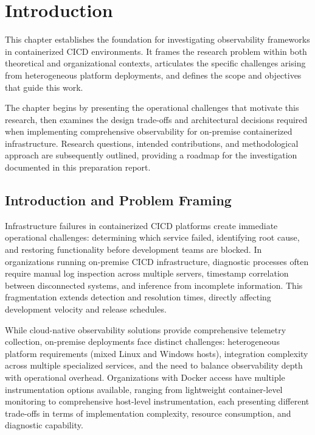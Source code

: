 \chapter{Introduction}
\label{chap:introduction}

This chapter establishes the foundation for investigating observability frameworks in containerized \ac{CICD} environments. It frames the research problem within both theoretical and organizational contexts, articulates the specific challenges arising from heterogeneous platform deployments, and defines the scope and objectives that guide this work.

The chapter begins by presenting the operational challenges that motivate this research, then examines the design trade-offs and architectural decisions required when implementing comprehensive observability for on-premise containerized infrastructure. Research questions, intended contributions, and methodological approach are subsequently outlined, providing a roadmap for the investigation documented in this preparation report.

\section{Introduction and Problem Framing}

Infrastructure failures in containerized \ac{CICD} platforms create immediate operational challenges: determining which service failed, identifying root cause, and restoring functionality before development teams are blocked. In organizations running on-premise \ac{CICD} infrastructure, diagnostic processes often require manual log inspection across multiple servers, timestamp correlation between disconnected systems, and inference from incomplete information. This fragmentation extends detection and resolution times, directly affecting development velocity and release schedules.

While cloud-native observability solutions provide comprehensive telemetry collection, on-premise deployments face distinct challenges: heterogeneous platform requirements (mixed Linux and Windows hosts), integration complexity across multiple specialized services, and the need to balance observability depth with operational overhead. Organizations with Docker access have multiple instrumentation options available, ranging from lightweight container-level monitoring to comprehensive host-level instrumentation, each presenting different trade-offs in terms of implementation complexity, resource consumption, and diagnostic capability.

